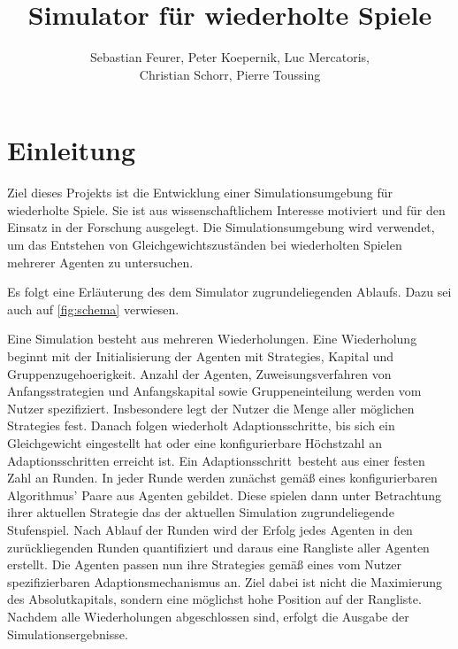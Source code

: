 \documentclass[parskip=full,11pt]{scrartcl}
\title{Simulator für wiederholte Spiele}
\author{Sebastian Feurer, Peter Koepernik, Luc Mercatoris,\\Christian Schorr, Pierre Toussing}
\def\adapt{Adaptionsschritt}
\def\adapts{Adaptionsschritte}
\begin{document}
\maketitle

\section{Einleitung}

Ziel dieses Projekts ist die Entwicklung einer Simulationsumgebung für wiederholte Spiele. Sie ist aus wissenschaftlichem Interesse motiviert und für den Einsatz in der Forschung ausgelegt. Die Simulationsumgebung wird verwendet, um das Entstehen von \Gls{Gleichgewicht}szuständen bei wiederholten Spielen mehrerer Agenten zu untersuchen.

Es folgt eine Erläuterung des dem Simulator zugrundeliegenden Ablaufs. Dazu sei auch auf \cref{fig:schema} verwiesen.

Eine Simulation besteht aus mehreren Wiederholungen. Eine Wiederholung beginnt mit der Initialisierung der Agenten mit \Glspl{Strategie}, \Gls{Kapital} und \Gls{Gruppenzugehoerigkeit}. Anzahl der Agenten, Zuweisungsverfahren von Anfangsstrategien und Anfangskapital sowie Gruppeneinteilung werden vom \Gls{Nutzer} spezifiziert. Insbesondere legt der \Gls{Nutzer} die Menge aller möglichen \Glspl{Strategie} fest. Danach folgen wiederholt \adapts, bis sich ein \Gls{Gleichgewicht} eingestellt hat oder eine konfigurierbare Höchstzahl an \adapts n erreicht ist. Ein \adapt\ besteht aus einer festen Zahl an Runden. In jeder Runde werden zunächst gemäß eines konfigurierbaren Algorithmus' Paare aus Agenten gebildet. Diese spielen dann unter Betrachtung ihrer aktuellen \Gls{Strategie} das der aktuellen Simulation zugrundeliegende \Gls{Stufenspiel}. Nach Ablauf der Runden wird der \Gls{Erfolg} jedes Agenten in den zurückliegenden Runden quantifiziert und daraus eine Rangliste aller Agenten erstellt. Die Agenten passen nun ihre \Glspl{Strategie} gemäß eines vom \Gls{Nutzer} spezifizierbaren Adaptionsmechanismus an. Ziel dabei ist nicht die Maximierung des Absolutkapitals, sondern eine möglichst hohe Position auf der Rangliste.\newline
Nachdem alle Wiederholungen abgeschlossen sind, erfolgt die Ausgabe der Simulationsergebnisse.
\end{document}
